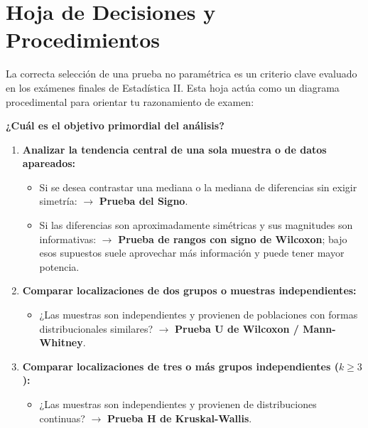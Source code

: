 \documentclass[11pt,a4paper]{article}
\begin{document}
\newpage
\section{Hoja de Decisiones y Procedimientos}

La correcta selección de una prueba no paramétrica es un criterio clave evaluado en los exámenes finales de Estadística II. Esta hoja actúa como un diagrama procedimental para orientar tu razonamiento de examen:

\begin{tcolorbox}[colback=green!5!white,colframe=green!40!black,title=Guía Procedimental para Elección de Método]
    \textbf{¿Cuál es el objetivo primordial del análisis?}
    \begin{enumerate}
        \item \textbf{Analizar la tendencia central de una sola muestra o de datos apareados:}
        \begin{itemize}
            \item Si se desea contrastar una mediana o la mediana de diferencias sin exigir simetría: $\rightarrow$ \textbf{Prueba del Signo}.
            \item Si las diferencias son aproximadamente simétricas y sus magnitudes son informativas: $\rightarrow$ \textbf{Prueba de rangos con signo de Wilcoxon}; bajo esos supuestos suele aprovechar más información y puede tener mayor potencia.
        \end{itemize}
        \item \textbf{Comparar localizaciones de dos grupos o muestras independientes:}
        \begin{itemize}
            \item ¿Las muestras son independientes y provienen de poblaciones con formas distribucionales similares? $\rightarrow$ \textbf{Prueba U de Wilcoxon / Mann-Whitney}.
        \end{itemize}
        \item \textbf{Comparar localizaciones de tres o más grupos independientes ($k \ge 3$):}
        \begin{itemize}
            \item ¿Las muestras son independientes y provienen de distribuciones continuas? $\rightarrow$ \textbf{Prueba H de Kruskal-Wallis}.
        \end{itemize}

\end{enumerate}
\end{tcolorbox}
\end{document}
